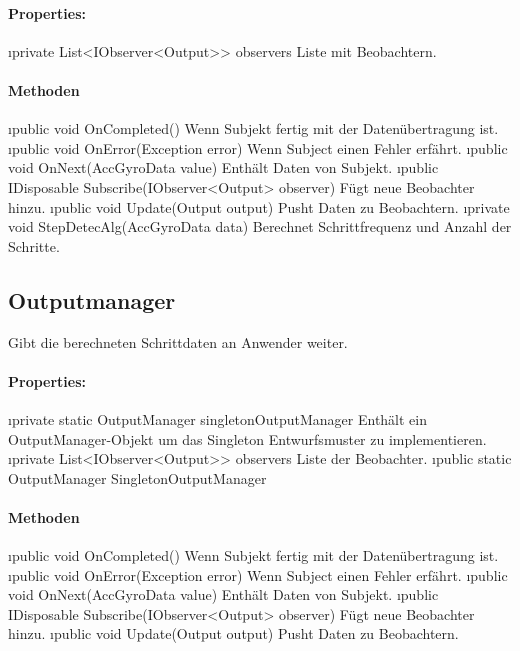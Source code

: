 \documentclass[../entwurf.tex]{subfiles}
\begin{document}
        \paragraph{Properties:}
        \begin{itemize}
            \i{private List<IObserver<Output>> observers} Liste mit Beobachtern.
        \end{itemize}
    
        \paragraph{Methoden}
        \begin{itemize}
            \i{public void OnCompleted()} Wenn Subjekt fertig mit der Datenübertragung ist.
            \i{public void OnError(Exception error)} Wenn Subject einen Fehler erfährt.
            \i{public void OnNext(AccGyroData value)} Enthält Daten von Subjekt.
            \i{public IDisposable Subscribe(IObserver<Output> observer)} Fügt neue Beobachter hinzu.
            \i{public void Update(Output output)} Pusht Daten zu Beobachtern.
            \i{private void StepDetecAlg(AccGyroData data)} Berechnet Schrittfrequenz und Anzahl der Schritte.
        \end{itemize}
    
    \subsection{Outputmanager}
        Gibt die berechneten Schrittdaten an Anwender weiter.
        \paragraph{Properties:}
        \begin{itemize}
            \i{private static OutputManager singletonOutputManager} Enthält ein OutputManager-Objekt um das Singleton Entwurfsmuster zu implementieren.
            \i{private List<IObserver<Output>> observers} Liste der Beobachter.
            \i{public static OutputManager SingletonOutputManager} 
        \end{itemize}
        \paragraph{Methoden}
        \begin{itemize}
            \i{public void OnCompleted()} Wenn Subjekt fertig mit der Datenübertragung ist.
            \i{public void OnError(Exception error)} Wenn Subject einen Fehler erfährt.
            \i{public void OnNext(AccGyroData value)} Enthält Daten von Subjekt.
            \i{public IDisposable Subscribe(IObserver<Output> observer)} Fügt neue Beobachter hinzu.
            \i{public void Update(Output output)} Pusht Daten zu Beobachtern.
        \end{itemize}
    
\end{document}
